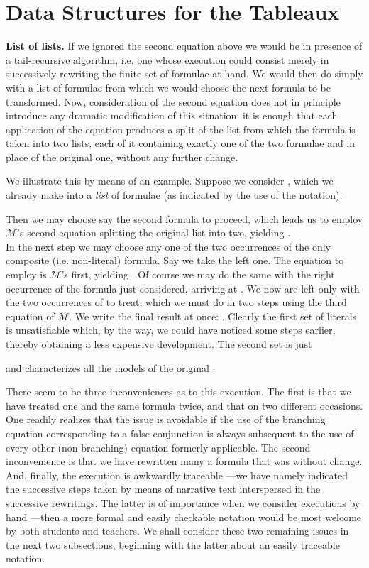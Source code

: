 \documentclass[a4paper,UKenglish]{lipics}
\newcounter{c}
\newcommand{\nentry}[1]{\noindent\textbf{#1}}
\newcommand{\allmodels}{\ensuremath{\mathcal{M}}}
\begin{document}
\section{Data Structures for the Tableaux}
\nentry{List of lists.} If we ignored the second equation above we would be in presence of a tail-recursive algorithm,  i.e. one whose execution could consist merely in successively rewriting the finite set of formulae at hand. We would then do simply with a list of formulae from which we would choose the next formula to be transformed. Now, consideration of the second equation does not in principle introduce any dramatic modification of this situation: it is enough that each application of the equation produces a split of the list from which the formula  is taken into two lists, each of it containing exactly one of the two formulae  and  in place of the original one, without any further change.


We illustrate this  by means of an example. Suppose we consider
 , 
\noindent which we already make into a \emph{list} of formulae (as indicated by the use of the  notation).

\noindent Then we may choose say the second formula to proceed, which leads us to employ \allmodels's second equation splitting the original list into two, yielding
.\\
In the next step we may choose any one of the two occurrences of the only composite (i.e. non-literal) formula. Say  we take the left one. The equation to employ is \allmodels's first, yielding
.
Of course we may do the same with the right occurrence of the formula just considered, arriving at
.
We now are left only with the two occurrences of  to treat, which we must do in two steps using the third equation of \allmodels. We write the final result at once:
. 
Clearly the first set of literals is unsatisfiable which, by the way, we could have noticed some steps earlier, thereby obtaining a less expensive development. The second set is just 

\noindent and characterizes all the models of the original .

There seem to be three inconveniences as to this execution. The first is that we have treated one and the same formula twice, and that on two different occasions. One readily realizes that the issue is avoidable if the use of the branching equation corresponding to a false conjunction is always subsequent to the use of every other (non-branching) equation formerly applicable.
The second inconvenience is that we have rewritten many a formula that was without change. And, finally, the execution is awkwardly traceable ---we have namely indicated the successive steps taken by means of narrative text interspersed in the successive rewritings. The latter is of importance when we consider executions by hand ---then a more formal and easily checkable notation would be most welcome by both students and teachers.
We shall consider these two remaining issues in the next two subsections, beginning with the latter about an easily traceable notation.
\end{document}
